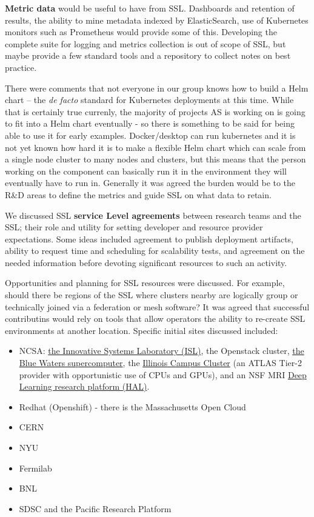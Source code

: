 \documentclass[11pt,letterpaper,fleqn]{article}
\begin{document}
{\bf Metric data} would be useful to have from SSL. Dashboards and retention of results, the ability to mine metadata indexed by ElasticSearch, use of Kubernetes monitors such as Prometheus would provide some of this.  Developing the complete suite for logging and metrics collection is out of scope of SSL, but maybe provide a few standard tools and a repository to collect notes on best practice.

There were comments that not everyone in our group knows how to build a Helm chart -- the \textit{de facto} standard for Kubernetes deployments at this time. While that is certainly true currenly, the majority of projects AS is working on is going to fit into a Helm chart eventually - so there is something to be said for being able to use it for early examples. Docker/desktop can run kubernetes and it is not yet known how hard it is to make a flexible Helm chart which can scale from a single node cluster to many nodes and clusters, but this means that the person working on the component can basically run it in the environment they will eventually have to run in. Generally it was agreed the burden would be to the R\&D areas to define the metrics and guide SSL on what data to retain.

We discussed SSL {\bf service Level agreements} between research teams and the SSL; their role and utility for setting developer and resource provider expectations.  Some ideas included agreement to publish deployment artifacts, ability to request time and scheduling for scalability tests, and agreement on the needed information before devoting significant resources to such an activity.

Opportunities and planning for SSL resources were discussed. For example, should there be regions of the SSL where clusters nearby are logically group or technically joined via a federation or mesh software? It was agreed that successful contributins would rely on tools that allow operators the ability to re-create SSL environments at another location. Specific initial sites discussed included:
\begin{itemize}
  \item NCSA: \href{http://www.ncsa.illinois.edu/about/org/isl}{the Innovative Systems Laboratory (ISL)}, the Openstack cluster, \href{http://www.ncsa.illinois.edu/enabling/bluewaters}{the Blue Waters supercomputer}, the \href{https://campuscluster.illinois.edu}{Illinois Campus Cluster} (an ATLAS Tier-2 provider with opportunistic use of CPUs and GPUs), and an NSF MRI \href{https://wiki.ncsa.illinois.edu/display/ISL20/HAL+cluster}{Deep Learning research platform (HAL)}.
  \item Redhat (Openshift) - there is the Massachusetts Open Cloud
  \item CERN
  \item NYU
  \item Fermilab
  \item BNL
  \item SDSC and the Pacific Research Platform
\end{itemize}
\end{document}
